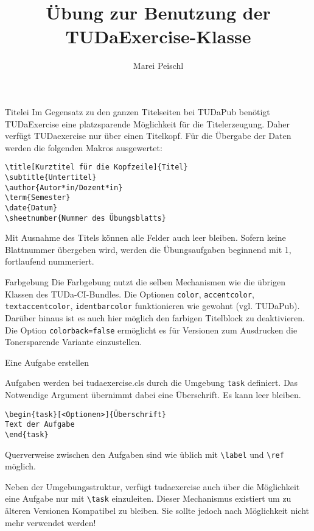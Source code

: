 \documentclass[
	german,%
	accentcolor=9c,%
	points=true, für die Aktivierung der Punktereferenzen
]{tudaexercise}
\title[Übung TUDaExercise]{Übung zur Benutzung der TUDaExercise-Klasse}
\author{Marei Peischl}
\newcommand*{\code}[1]{\texttt{#1}}
\newcommand*{\cls}[1]{\textsf{#1}}
\let\tbs\textbackslash
\begin{document}
\maketitle

\begin{task}{Titelei}
	Im Gegensatz zu den ganzen Titelseiten bei TUDaPub benötigt TUDaExercise eine platzsparende Möglichkeit für die Titelerzeugung.
	Daher verfügt TUDaexercise nur über einen Titelkopf.
	Für die Übergabe der Daten werden die folgenden Makros ausgewertet:

\begin{verbatim}
\title[Kurztitel für die Kopfzeile]{Titel}
\subtitle{Untertitel}
\author{Autor*in/Dozent*in}
\term{Semester}
\date{Datum}
\sheetnumber{Nummer des Übungsblatts}
\end{verbatim}

	Mit Ausnahme des Titels können alle Felder auch leer bleiben.
	Sofern keine Blattnummer übergeben wird, werden die Übungsaufgaben beginnend mit 1, fortlaufend nummeriert.
\end{task}

\begin{task}{Farbgebung}
	Die Farbgebung nutzt die selben Mechanismen wie die übrigen Klassen des TUDa-CI-Bundles. Die Optionen \code{color}, \code{accentcolor}, \code{textaccentcolor}, \code{identbarcolor} funktionieren wie gewohnt (vgl. TUDaPub). Darüber hinaus ist es auch hier möglich den farbigen Titelblock zu deaktivieren. Die Option \code{colorback=false} ermöglicht es für Versionen zum Ausdrucken die Tonersparende Variante einzustellen.
\end{task}

\begin{task}{Eine Aufgabe erstellen}

	Aufgaben werden bei \cls{tudaexercise.cls} durch die Umgebung \code{task} definiert. Das Notwendige Argument übernimmt dabei eine Überschrift. Es kann leer bleiben.

\begin{verbatim}
\begin{task}[<Optionen>]{Überschrift}
Text der Aufgabe
\end{task}
\end{verbatim}

	Querverweise zwischen den Aufgaben sind wie üblich mit \code{\tbs{}label} und \code{\tbs{}ref} möglich.

	\minisec{Die Verwendung des Makros \code{\tbs{}task}}
	Neben der Umgebungsstruktur, verfügt \cls{tudaexercise} auch über die Möglichkeit eine Aufgabe nur mit \code{\tbs{}task} einzuleiten. Dieser Mechanismus existiert um zu älteren Versionen Kompatibel zu bleiben. Sie sollte jedoch nach Möglichkeit nicht mehr verwendet werden!

\end{task}
\end{document}
